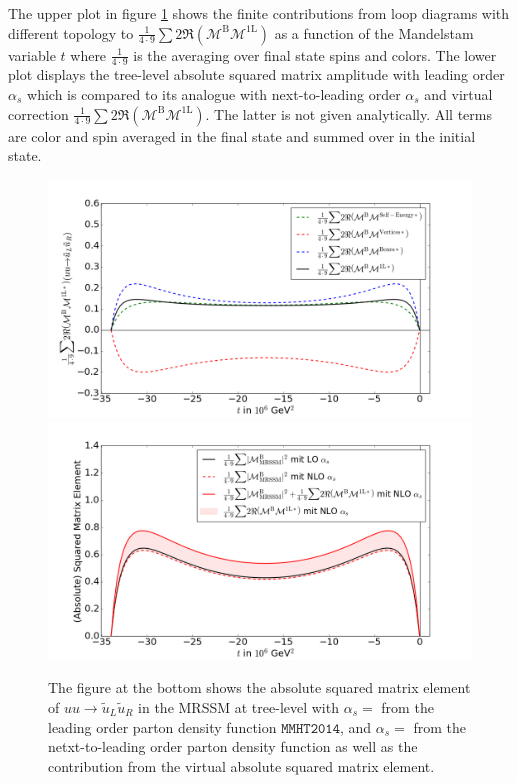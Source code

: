 The upper plot in figure \ref{fig:MatrixElement} shows the finite contributions from loop diagrams with different topology to $\frac{1}{4\cdot 9}\sum 2 \Re (\mathcal{M}^{\mathrm{B}}\mathcal{M}^{\mathrm{1L}})$ as a function of the Mandelstam variable $t$ where $\frac{1}{4\cdot 9}$ is the averaging over final state spins and colors. The lower plot displays the tree-level absolute squared matrix amplitude with leading order $\alpha_s$ which is compared to its analogue with next-to-leading order $\alpha_s$ and virtual correction $\frac{1}{4\cdot 9}\sum 2 \Re (\mathcal{M}^{\mathrm{B}}\mathcal{M}^{\mathrm{1L}})$. The latter is not given analytically. All terms are color and spin averaged in the final state and summed over in the initial state.
\begin{figure}[!htpb]
\begin{center}
\includegraphics[scale=.5]{figures/MatrixElement_SE_Vertices_Boxes}
\includegraphics[scale=.5]{figures/MatrixElement.png}
\caption{\newline
The figure at the bottom shows the absolute squared matrix element of $uu \to \tilde{u}_L\tilde{u}_R$ in the MRSSM at tree-level with $\alpha_s = $ from the leading order parton density function $\mathtt{MMHT2014}$\cite{Harland-Lang:2014zoa}, and $\alpha_s = $ from the netxt-to-leading order parton density function as well as the contribution from the virtual absolute squared matrix element.}\label{fig:MatrixElement}
\end{center}
\end{figure}